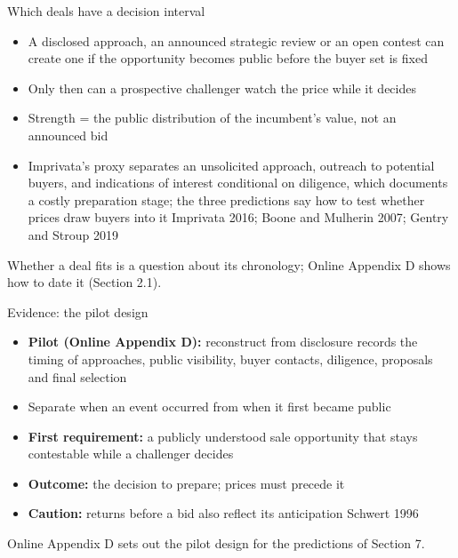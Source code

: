 \documentclass[10pt,aspectratio=169]{beamer}
\makeatletter
\newif\iftalk@appendix
\let\talk@AppendixStart\AppendixStart
\renewcommand{\AppendixStart}{\global\talk@appendixtrue\talk@AppendixStart}
\newcommand{\GrayLine}[1]{\par{\color{cGrayText}\footnotesize #1\par}}
\providecommand{\graycite}{}
\renewcommand{\graycite}[1]{{\color{cGrayText}\footnotesize #1}}
\newcommand{\NavGap}{\par\vspace{0.45cm}}%
\let\AdapterBackButton\BackButton
\renewcommand{\BackButton}[1]{\NavGap\AdapterBackButton{#1}}%
\makeatother
\begin{document}
\AppendixStart

\begin{frame}[label=A1]{Which deals have a decision interval}
\hypertarget{app:interval}{}
\begin{itemize}\setlength{\itemsep}{6pt}
\item A disclosed approach, an announced strategic review or an open contest can create one if the opportunity becomes public before the buyer set is fixed
\item Only then can a prospective challenger watch the price while it decides
\item Strength = the public distribution of the incumbent's value, not an announced bid
\item Imprivata's proxy separates an unsolicited approach, outreach to potential buyers, and indications of interest conditional on diligence, which documents a costly preparation stage; the three predictions say how to test whether prices draw buyers into it \graycite{Imprivata 2016; Boone and Mulherin 2007; Gentry and Stroup 2019}
\end{itemize}
\vspace{0.4em}
\GrayLine{Whether a deal fits is a question about its chronology; Online Appendix D shows how to date it (Section 2.1).}
\end{frame}

\begin{frame}[label=A2]{Evidence: the pilot design}
\hypertarget{app:evidence}{}
\begin{itemize}\setlength{\itemsep}{6pt}
\item \textbf{Pilot (Online Appendix D):} reconstruct from disclosure records the timing of approaches, public visibility, buyer contacts, diligence, proposals and final selection
\item Separate when an event occurred from when it first became public
\item \textbf{First requirement:} a publicly understood sale opportunity that stays contestable while a challenger decides
\item \textbf{Outcome:} the decision to prepare; prices must precede it
\item \textbf{Caution:} returns before a bid also reflect its anticipation \graycite{Schwert 1996}
\end{itemize}
\vspace{0.4em}
\GrayLine{Online Appendix D sets out the pilot design for the predictions of Section 7.}
\end{frame}
\end{document}
